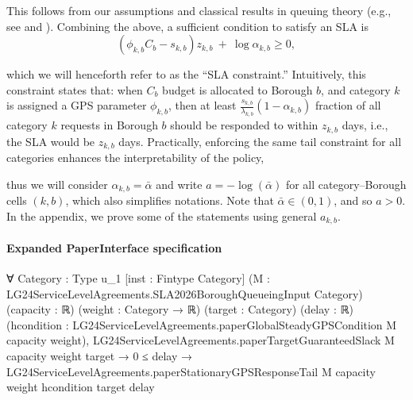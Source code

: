 \documentclass[10pt]{article}
\begin{document}
\begin{ReviewVerbatim}
This follows from our assumptions and classical results in queuing theory (e.g., see \cite{kleinrock1975queue} and \cite{liu2001maximizing}). Combining the above, a sufficient condition to satisfy an SLA is
\begin{equation}
    (\phi_{k,b} C_b-{s_{k,b}})z_{k,b}
    \ +\ \log \alpha_{k,b}\geq0,
    \label{def:sla}
\end{equation}








  which we will henceforth refer to as the ``SLA constraint.'' Intuitively, this constraint states that: when $C_b$ budget is allocated to Borough $b$, and category $k$ is assigned a GPS parameter $\phi_{k,b}$, then at least $\frac{s_{k,b}}{\lambda_{k,b}}(1-\alpha_{k,b})$ fraction of all category $k$ requests in Borough $b$ should be {responded to} within $z_{k,b}$ days, i.e., the SLA would be $z_{k,b}$ days. Practically, enforcing the same tail constraint for all categories enhances the interpretability of the policy,

thus we will consider {$\alpha_{k,b}=\bar\alpha$ and write $a=-\log(\bar\alpha)$} for all category--Borough cells $(k,b)$, which also simplifies notations. Note that {$\bar\alpha\in(0,1)$}, and so {$a>0$}. In the appendix, we prove some of the statements using general $a_{k,b}$.
\end{ReviewVerbatim}



\paragraph{Expanded PaperInterface specification}
\begin{ReviewVerbatim}
∀ {Category : Type u_1} [inst : Fintype Category] (M : LG24ServiceLevelAgreements.SLA2026BoroughQueueingInput Category)
  (capacity : ℝ) (weight : Category → ℝ) (target : Category) (delay : ℝ)
  (hcondition : LG24ServiceLevelAgreements.paperGlobalSteadyGPSCondition M capacity weight),
  LG24ServiceLevelAgreements.paperTargetGuaranteedSlack M capacity weight target →
    0 ≤ delay → LG24ServiceLevelAgreements.paperStationaryGPSResponseTail M capacity weight hcondition target delay
\end{ReviewVerbatim}
\end{document}
